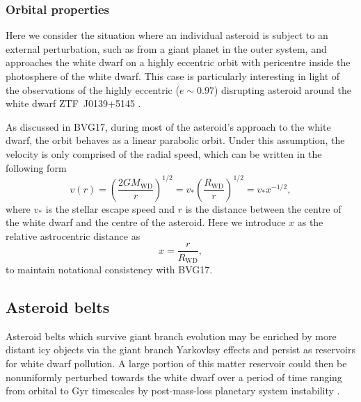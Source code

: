 \documentclass[fleqn,usenatbib]{mnras}
\begin{document}
\subsubsection{Orbital properties} \label{subsubsec:ast_orbital}

Here we consider the situation where an individual asteroid is subject to an external perturbation, such as from a giant planet in the outer system, and approaches the white dwarf on a highly eccentric orbit with pericentre inside the photosphere of the white dwarf. 
This case is particularly interesting in light of the observations of the highly eccentric ($e \sim 0.97$) disrupting asteroid around the white dwarf ZTF~J0139+5145 \citep{Vanderbosch2020}.

As discussed in BVG17, during most of the asteroid's approach to the white dwarf, the orbit behaves as a linear parabolic orbit. 
Under this assumption, the velocity is only comprised of the radial speed, which can be written in the following form
\begin{equation}
    \label{eq:orbital_velocity}
    v(r) = \left( \frac{2 G M_\text{WD}}{r} \right)^{1/2} = v_* \left( \frac{R_\text{WD}}{r} \right)^{1/2} = v_* x^{-1/2},
\end{equation}
where $v_*$ is the stellar escape speed and $r$ is the distance between the centre of the white dwarf and the centre of the asteroid.
Here we introduce $x$ as the relative astrocentric distance as 
\begin{equation}
    \label{eq:astero_dist}
    x = \frac{r}{R_\text{WD}}, 
\end{equation}
to maintain notational consistency with BVG17.

\subsection{Asteroid belts} \label{subsec:belt_props}
Asteroid belts which survive giant branch evolution may be enriched by more distant icy objects via the giant branch Yarkovksy effects \citep{Veras2019} and persist as reservoirs for white dwarf pollution. 
A large portion of this matter reservoir could then be nonuniformly perturbed towards the white dwarf over a period of time ranging from orbital to Gyr timescales by post-mass-loss planetary system instability \citep{Mustill2018}.
\end{document}
